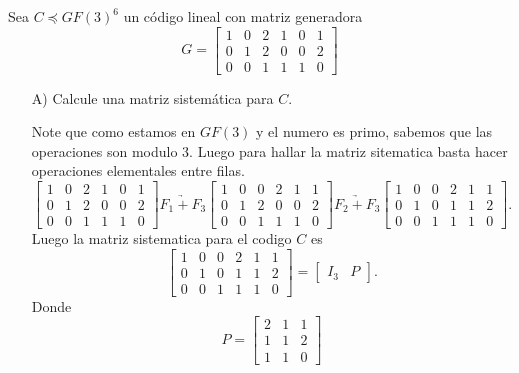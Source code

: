 
Sea $C \preceq GF(3)^6$ un código lineal con matriz generadora
\begin{equation*}
    G = \begin{bmatrix} 1 & 0 & 2 & 1 & 0 & 1 \\ 0 & 1 & 2 & 0 & 0 & 2 \\ 0 & 0 & 1 & 1 & 1 & 0 \end{bmatrix}
\end{equation*}

\begin{itemize}
    \item[A)] Calcule una matriz sistemática para $C$.
    \begin{sols}
        Note que como estamos en $GF(3)$ y el numero es primo, sabemos que las operaciones son modulo 3. Luego para hallar la matriz sitematica basta hacer operaciones elementales entre filas.
        $$\begin{bmatrix} 1 & 0 & 2 & 1 & 0 & 1 \\ 0 & 1 & 2 & 0 & 0 & 2 \\ 0 & 0 & 1 & 1 & 1 & 0 \end{bmatrix}\underrightarrow{F_1+F_3}\begin{bmatrix} 1 & 0 & 0 & 2 & 1 & 1 \\ 0 & 1 & 2 & 0 & 0 & 2 \\ 0 & 0 & 1 & 1 & 1 & 0 \end{bmatrix}\underrightarrow{F_2+F_3}\begin{bmatrix} 1 & 0 & 0 & 2 & 1 & 1 \\ 0 & 1 & 0 & 1 & 1 & 2 \\ 0 & 0 & 1 & 1 & 1 & 0 \end{bmatrix}.$$
        Luego la matriz sistematica para el codigo $C$ es 
        $$\begin{bmatrix} 1 & 0 & 0 & 2 & 1 & 1 \\ 0 & 1 & 0 & 1 & 1 & 2 \\ 0 & 0 & 1 & 1 & 1 & 0 \end{bmatrix}=[\begin{array}{c|c}
            I_3&P
        \end{array}].$$
        Donde 
        $$P=\begin{bmatrix} 2 & 1 & 1 \\ 1 & 1 & 2 \\ 1 & 1 & 0 \end{bmatrix}$$


\end{sols}
\end{itemize}
